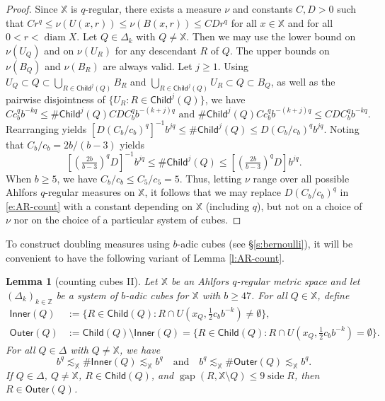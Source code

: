 \documentclass[12pt]{amsart}
\newtheorem{lemma}[theorem]{Lemma}
\theoremstyle{definition}
\theoremstyle{remark}
\newcommand{\ZZ}{\mathbb{Z}}
\newcommand{\XX}{\mathbb{X}}
\newcommand{\diam}{\mathop\mathrm{diam}\nolimits}
\newcommand{\side}{\mathop\mathrm{side}\nolimits}
\newcommand{\gap}{\mathop\mathrm{gap}\nolimits}
\newcommand{\Child}{\mathsf{Child}}
\newcommand{\Outer}{\mathsf{Outer}}
\newcommand{\Inner}{\mathsf{Inner}}
\numberwithin{figure}{section}
\numberwithin{equation}{section}
\begin{document}
\begin{proof} Since $\XX$ is $q$-regular, there exists a measure $\nu$ and constants $C,D>0$ such that $Cr^q\leq \nu(U(x,r))\leq \nu(B(x,r))\leq CD r^q$ for all $x\in\XX$ and for all $0<r<\diam X$. Let $Q\in\Delta_k$ with $Q\neq \XX$. Then we may use the lower bound on $\nu(U_Q)$ and on $\nu(U_R)$ for any descendant $R$ of $Q$. The upper bounds on $\nu(B_Q)$ and $\nu(B_R)$ are always valid. Let $j\geq 1$. Using $U_Q\subset Q\subset \bigcup_{R\in\Child^j(Q)}B_R$ and $\bigcup_{R\in\Child^j(Q)}U_R\subset Q\subset B_Q$, as well as the pairwise disjointness of $\{U_R:R\in\Child^j(Q)\}$, we have $$Cc_b^qb^{-kq} \leq \#\Child^j(Q)CDC_b^qb^{-(k+j)q}\text{\ \ and\ \ }\#\Child^j(Q)Cc_b^qb^{-(k+j)q}\leq CDC_b^qb^{-kq}.$$ Rearranging yields $[D(C_b/c_b)^q]^{-1} b^{jq}\leq \#\Child^j(Q) \leq D(C_b/c_b)^q b^{jq}$. Noting that $C_b/c_b=2b/(b-3)$ yields \begin{equation}\label{e:AR-count} \left[(\tfrac{2b}{b-3})^q D\right]^{-1} b^{jq}\leq \#\Child^j(Q) \leq \left[(\tfrac{2b}{b-3})^q D\right] b^{jq}.\end{equation} When $b\geq 5$, we have $C_b/c_b\leq C_5/c_5=5$. Thus, letting $\nu$ range over all possible Ahlfors $q$-regular measures on $\XX$, it follows that we may replace $D(C_b/c_b)^q$ in \eqref{e:AR-count} with a constant depending on $\XX$ (including $q$), but not on a choice of $\nu$ nor on the choice of a particular system of cubes.
\end{proof}

To construct doubling measures using $b$-adic cubes (see \S\ref{s:bernoulli}), it will be convenient to have the following variant of Lemma \ref{l:AR-count}.

\begin{lemma}[counting cubes II]\label{l:2AR-count} Let $\XX$ be an Ahlfors $q$-regular metric space and let  $(\Delta_k)_{k\in\ZZ}$ be a system of $b$-adic cubes for $\XX$ with $b\geq 47$. For all $Q\in\XX$, define \begin{align}
\Inner(Q)&:=\{R\in\Child(Q):R\cap U(x_Q,\tfrac12c_b b^{-k})\neq\emptyset\} \label{inner-def},\\
\Outer(Q)&:=\Child(Q)\setminus\Inner(Q)=\{R\in\Child(Q):R\cap U(x_Q,\tfrac12c_b b^{-k})=\emptyset\} \label{outer-def}.\end{align} For all $Q\in\Delta$ with $Q\neq\XX$, we have \begin{equation}\label{in-out-count} b^q\lesssim_\XX\#\Inner(Q)\lesssim_\XX b^q\quad\text{and}\quad b^q\lesssim_\XX\#\Outer(Q)\lesssim_\XX b^q.\end{equation} If $Q\in\Delta$, $Q\neq\XX$, $R\in\Child(Q)$, and $\gap(R,\XX\setminus Q)\leq 9\side R$, then $R\in\Outer(Q)$.
\end{lemma}
\end{document}
